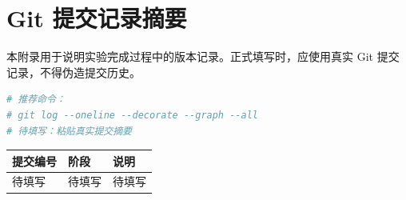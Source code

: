 \section{Git 提交记录摘要}

本附录用于说明实验完成过程中的版本记录。正式填写时，应使用真实 Git 提交记录，不得伪造提交历史。

\begin{lstlisting}[language=bash,caption={Git 提交记录摘要}]
# 推荐命令：
# git log --oneline --decorate --graph --all
# 待填写：粘贴真实提交摘要
\end{lstlisting}

\begin{longtable}{p{2.2cm}p{4cm}p{7cm}}
\toprule
提交编号 & 阶段 & 说明 \\
\midrule
待填写 & 待填写 & 待填写 \\
\bottomrule
\end{longtable}
